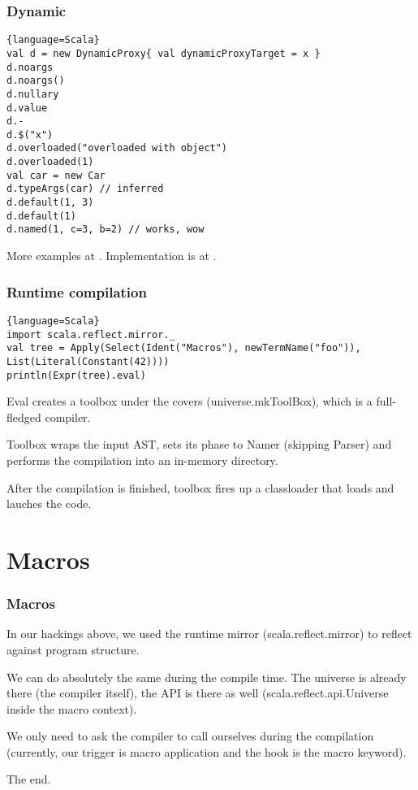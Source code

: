 \documentclass[hyperref={bookmarks=false}]{beamer}
\begin{document}
\begin{frame}[fragile]
\frametitle{Dynamic}

\begin{lstlisting}{language=Scala}
val d = new DynamicProxy{ val dynamicProxyTarget = x }
d.noargs
d.noargs()
d.nullary
d.value
d.-
d.$("x")
d.overloaded("overloaded with object")
d.overloaded(1)
val car = new Car
d.typeArgs(car) // inferred
d.default(1, 3)
d.default(1)
d.named(1, c=3, b=2) // works, wow
\end{lstlisting}

More examples at .
Implementation is at .

\end{frame}

\begin{frame}[fragile]
\frametitle{Runtime compilation}

\begin{lstlisting}{language=Scala}
import scala.reflect.mirror._
val tree = Apply(Select(Ident("Macros"), newTermName("foo")), List(Literal(Constant(42))))
println(Expr(tree).eval)
\end{lstlisting}

Eval creates a toolbox under the covers (universe.mkToolBox), which is a full-fledged compiler.

Toolbox wraps the input AST, sets its phase to Namer (skipping Parser) and performs the compilation into an in-memory directory.

After the compilation is finished, toolbox fires up a classloader that loads and lauches the code.

\end{frame}

\section{Macros}

\begin{frame}[fragile]
\frametitle{Macros}

In our hackings above, we used the runtime mirror (scala.reflect.mirror) to reflect against program structure.

We can do absolutely the same during the compile time.
The universe is already there (the compiler itself), the API is there as well
(scala.reflect.api.Universe inside the macro context).

We only need to ask the compiler to call ourselves during the compilation
(currently, our trigger is macro application and the hook is the macro keyword).

The end.

\end{frame}
\end{document}
